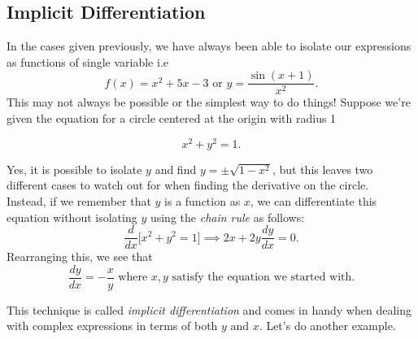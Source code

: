 \documentclass[12pt]{article}
\newcommand{\diff}[2]{\frac{d #1}{d #2} }
\theoremstyle{definition}
\theoremstyle{plain}
\numberwithin{equation}{section}
\begin{document}

\subsection{Implicit Differentiation}

In the cases given previously, we have always been able to isolate our expressions as functions of single variable i.e
\[
f(x)=x^2+5x-3\text{ or }y=\frac{\sin (x+1)}{x^2}.
\]
This may not always be possible or the simplest way to do things! Suppose we're given the equation for a circle centered at the origin with radius 1

\[
x^2+y^2=1.
\]

Yes, it is possible to isolate $y$ and find $y=\pm \sqrt{1-x^2}$, but this leaves two different cases to watch out for when finding the derivative on the circle.\\

Instead, if we remember that $y$ is a function as $x$, we can differentiate this equation without isolating $y$ using the \emph{chain rule} as follows:
\begin{equation}
  \diff{}{x}\big[x^2+y^2=1\big]\implies 2x+2y\diff{y}{x}=0.
\end{equation}
Rearranging this, we see that
\[
\diff{y}{x}=-\frac{x}{y} \text{ where $x,y$ satisfy the equation we started with.}
\]

This technique is called \emph{implicit differentiation} and comes in handy when dealing with complex expressions in terms of both $y$ and $x$. Let's do another example.
\end{document}

